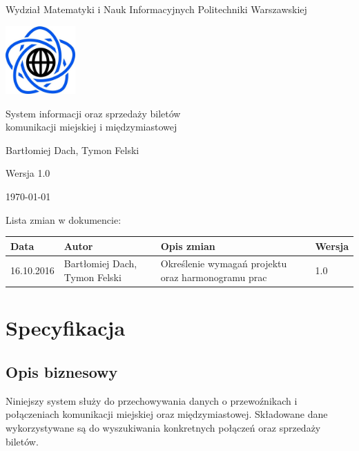 \documentclass[10pt,a4paper]{article}
\begin{document}
\begin{titlepage}
	\centering
	{\Large Wydział Matematyki i Nauk Informacyjnych Politechniki Warszawskiej \par}
	\vspace{1cm}
	\includegraphics[width=0.2\textwidth]{logo.png} \par
	\vspace{5cm}
	{\LARGE System informacji oraz sprzedaży biletów\\komunikacji miejskiej i międzymiastowej \par}
	\vspace{0.5cm}
	{\Large Bartłomiej Dach, Tymon Felski \par}
	\vspace{1.5cm}
	{\Large Wersja 1.0 \par}
	\vspace{1.5cm}
	{\Large \today \par}
\end{titlepage}
Lista zmian w dokumencie:
\begin{table}[H]
\def\arraystretch{1.5}
\begin{tabularx}{\textwidth}{|l|l|X|l|}
	\hline
	\textbf{Data} & \textbf{Autor} & \textbf{Opis zmian} & \textbf{Wersja} \\
	\hline
	16.10.2016 & Bartłomiej Dach, Tymon Felski & Określenie wymagań projektu oraz harmonogramu prac & 1.0 \\
	\hline
\end{tabularx}
\end{table}

\tableofcontents
\newpage

\section{Specyfikacja}

\subsection{Opis biznesowy}
Niniejszy system służy do przechowywania danych o przewoźnikach i połączeniach komunikacji miejskiej oraz międzymiastowej. Składowane dane wykorzystywane są do wyszukiwania konkretnych połączeń oraz sprzedaży biletów.
\end{document}

